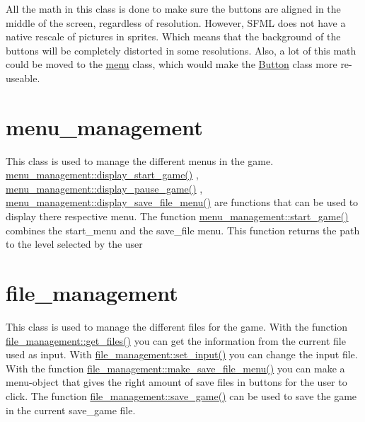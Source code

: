 All the math in this class is done to make sure the buttons are aligned in the middle of the screen, regardless of resolution. However, S\+F\+ML does not have a native rescale of pictures in sprites. Which means that the background of the buttons will be completely distorted in some resolutions. Also, a lot of this math could be moved to the \hyperlink{classmenu}{menu} class, which would make the \hyperlink{class_button}{Button} class more re-\/useable.\hypertarget{index_menu_management}{}\section{menu\+\_\+management}\label{index_menu_management}
This class is used to manage the different menu\textquotesingle{}s in the game. \hyperlink{classmenu__management_aad6e975e03cab2478f3ebec8da7eaf7d}{menu\+\_\+management\+::display\+\_\+start\+\_\+game()} , \hyperlink{classmenu__management_ab7aa6674e3428604073af06efe5aa791}{menu\+\_\+management\+::display\+\_\+pause\+\_\+game()} , \hyperlink{classmenu__management_ac64c1eace3d955be8623a1129597dc54}{menu\+\_\+management\+::display\+\_\+save\+\_\+file\+\_\+menu()} are functions that can be used to display there respective menu. The function \hyperlink{classmenu__management_a92d22f059d33ccc5c3ae485804fd5fbb}{menu\+\_\+management\+::start\+\_\+game()} combines the start\+\_\+menu and the save\+\_\+file menu. This function returns the path to the level selected by the user\hypertarget{index_file_management}{}\section{file\+\_\+management}\label{index_file_management}
This class is used to manage the different files for the game. With the function \hyperlink{classfile__management_a6c3f90ce958156adea878510097d64ef}{file\+\_\+management\+::get\+\_\+files()} you can get the information from the current file used as input. With \hyperlink{classfile__management_a090d9aba4dd5a795428ccbfe8d4037e6}{file\+\_\+management\+::set\+\_\+input()} you can change the input file. With the function \hyperlink{classfile__management_a97eda13bca5dbe703663bf81f83a77a0}{file\+\_\+management\+::make\+\_\+save\+\_\+file\+\_\+menu()} you can make a menu-\/object that gives the right amount of save files in buttons for the user to click. The function \hyperlink{classfile__management_a79e6ae7cec63aa959d7d0730d6ffa5a3}{file\+\_\+management\+::save\+\_\+game()} can be used to save the game in the current save\+\_\+game file. 